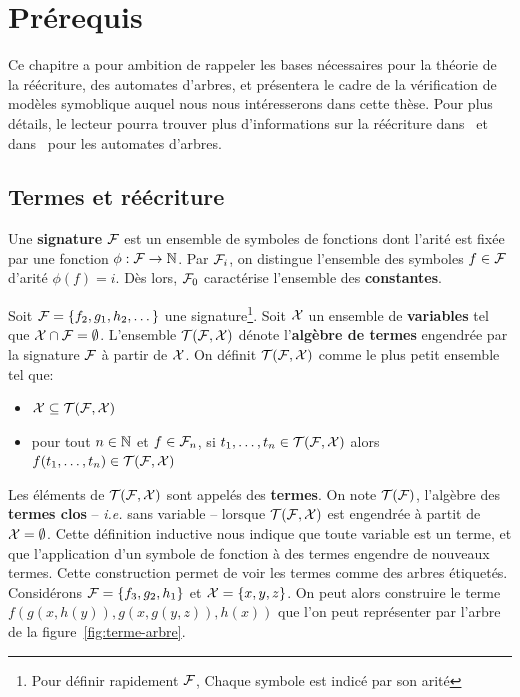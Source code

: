 \chapter{Prérequis}
\label{chap:preliminaires}

Ce chapitre a pour ambition de rappeler les bases nécessaires pour la théorie de la réécriture,
des automates d'arbres, et présentera le cadre de la vérification de modèles symoblique auquel
nous nous intéresserons dans cette thèse. Pour plus détails, le lecteur pourra trouver plus d'informations
sur la réécriture dans~\cite{BaaderN-book98} et dans~\cite{TATA} pour les automates d'arbres.


\section{Termes et réécriture}

\begin{definition}
  Une \textbf{signature} $\mathcal{F}$ est un ensemble de symboles de fonctions dont l'arité est fixée par
  une fonction $\phi : \mathcal{F} \rightarrow \mathbb{N}$. Par $\mathcal{F}_i$, on distingue l'ensemble des symboles $ f \in \mathcal{F}$
  d'arité $\phi(f) = i$. Dès lors, $\mathcal{F}_0$ caractérise l'ensemble des \textbf{constantes}.
\end{definition}


\begin{definition}
  Soit $\mathcal{F} = \{ f_2, g_1, h_2, \dots\}$ une signature\footnote{\footnotesize Pour définir rapidement $\mathcal{F}$, Chaque symbole est indicé par son arité}.
  Soit $\mathcal X$ un ensemble de \textbf{variables} tel que $\mathcal X \cap \mathcal{F} = \emptyset$.
  L'ensemble $\mathcal{T(F, X)}$ dénote l'\textbf{algèbre de termes} engendrée par la signature $\mathcal{F}$ à partir de $\mathcal X$. On définit $\mathcal{T(F, X)}$ comme le plus petit ensemble
  tel que:
  \begin{itemize}
  \item $\mathcal X \subseteq \mathcal{T(F, X)}$ 
  \item pour tout $n \in \mathbb{N}$ et $f \in \mathcal{F}_n$, si $t_1, \dots, t_n \in \mathcal{T(F, X)}$ alors $f(t_1, \dots, t_n) \in \mathcal{T(F, X)}$
  \end{itemize}
\end{definition}
Les éléments de $\mathcal{T(F, X)}$ sont appelés des \textbf{termes}. On note $\mathcal{T(F)}$, l'algèbre des \textbf{termes clos} -- \textit{i.e.} 
sans variable -- lorsque $\mathcal{T(F, X)}$ est engendrée à partit de $\mathcal X = \emptyset$.
Cette définition inductive nous indique que toute variable est un terme, 
et que l'application d'un symbole de fonction à des termes engendre de nouveaux termes. Cette construction permet de voir
les termes comme des arbres étiquetés.
Considérons $\mathcal{F} = \{ f_3, g_2, h_1 \}$ et $\mathcal X = \{x, y, z\}$. On peut alors construire le terme $f(g(x,h(y)), g(x, g(y, z)), h(x))$
que l'on peut représenter par l'arbre de la figure~\ref{fig:terme-arbre}.

